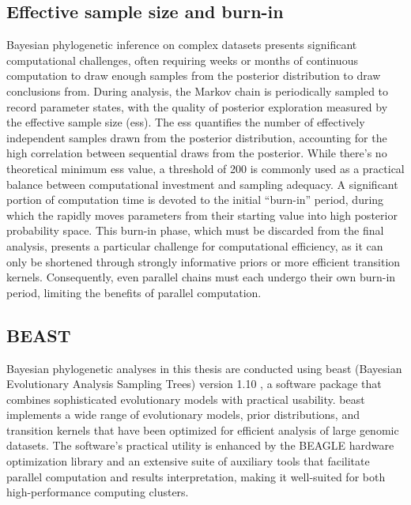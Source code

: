 \subsection{Effective sample size and burn-in}

Bayesian phylogenetic inference on complex datasets presents significant computational challenges, often requiring weeks or months of continuous computation to draw enough samples from the posterior distribution to draw conclusions from.
During analysis, the Markov chain is periodically sampled to record parameter states, with the quality of posterior exploration measured by the effective sample size (\gls{ess}).
The \gls{ess} quantifies the number of effectively independent samples drawn from the posterior distribution, accounting for the high correlation between sequential draws from the posterior.
While there's no theoretical minimum \gls{ess} value, a threshold of 200 is commonly used as a practical balance between computational investment and sampling adequacy.
A significant portion of computation time is devoted to the initial ``burn-in'' period, during which the rapidly moves parameters from their starting value into high posterior probability space.
This burn-in phase, which must be discarded from the final analysis, presents a particular challenge for computational efficiency, as it can only be shortened through strongly informative priors or more efficient transition kernels.
Consequently, even parallel chains must each undergo their own burn-in period, limiting the benefits of parallel computation.

\subsection{BEAST}
Bayesian phylogenetic analyses in this thesis are conducted using \gls{beast} (Bayesian Evolutionary Analysis Sampling Trees) version 1.10 \citep{suchard2018bayesian}, a software package that combines sophisticated evolutionary models with practical usability.
\gls{beast} implements a wide range of evolutionary models, prior distributions, and transition kernels that have been optimized for efficient analysis of large genomic datasets. 
The software's practical utility is enhanced by the BEAGLE \citep{ayres2019beagle} hardware optimization library and an extensive suite of auxiliary tools that facilitate parallel computation and results interpretation, making it well-suited for both high-performance computing clusters.

\cleardoublepage

